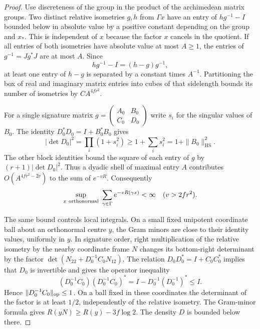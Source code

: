 \begin{proof}
Use discreteness of the group in the product of the
archimedean matrix groups. Two distinct relative
isometries \(g,h\) from \(\Gamma x\) have an entry of
\(hg^{-1}-I\) bounded below in absolute value by a
positive constant depending on the group and \(x_*\).
This is independent of \(x\) because the factor \(x\)
cancels in the quotient. If all entries of both
isometries have absolute value at most \(A\ge1\),
the entries of \(g^{-1}=Jg^*J\) are at most \(A\).
Since 
\[
  hg^{-1}-I=(h-g)g^{-1},
\]
 at least one entry of
\(h-g\) is separated by a constant times \(A^{-1}\).
Partitioning the box of real and imaginary matrix
entries into cubes of that sidelength bounds its
number of isometries by \(C A^{4fr^2}\).

For a single signature matrix \(g=\left(\begin{smallmatrix}
A_0&B_0\\ C_0&D_0\end{smallmatrix}\right)\) write \(s_i\) for the singular values of \(B_0\). The identity
\(D_0^*D_0=I+B_0^*B_0\) gives
\[
 |\det D_0|^2=\prod_i(1+s_i^2)\ge1+\sum_i s_i^2
 =1+\|B_0\|_{\mathrm{HS}}^2.
\]
The other block identities bound the square of
each entry of \(g\) by \((r+1)|\det D_0|^2\).
Thus a dyadic shell of maximal entry \(A\) contributes
\(O(A^{4fr^2-2v})\) to the sum of \(e^{-vR}\).
Consequently
\[
          \sup_{x\ {\rm orthonormal}}\
               \sum_{\gamma\in\Gamma}e^{-vR(\gamma x)}<\infty
                 \quad(v>2fr^2).
\]

The same bound controls local integrals. On a small
fixed unipotent coordinate ball about an orthonormal
centre \(y\), the Gram minors are close to their identity
values, uniformly in \(y\). In signature order, right
multiplication of the relative isometry by the nearby
coordinate frame \(N\) changes its bottom-right
determinant by the factor
\(\det(N_{22}+D_0^{-1}C_0N_{12})\).
The relation \(D_0D_0^*=I+C_0C_0^*\) implies that \(D_0\) is
invertible and gives the operator inequality
\[
 (D_0^{-1}C_0)(D_0^{-1}C_0)^*
 =I-D_0^{-1}(D_0^{-1})^*\le I.
\]
Hence \(\|D_0^{-1}C_0\|_{\rm op}\le1\). On a ball fixed in
these coordinates the determinant of the factor is at
least \(1/2\), independently of the relative isometry.
The Gram-minor formula gives \(R(yN)\ge R(y)-3f\log2\).
The density \(D\) is bounded below there.


\end{proof}
